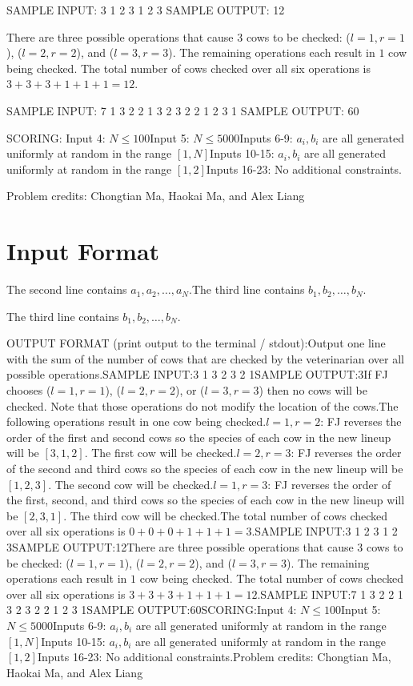 \documentclass[12pt]{article}
\begin{document}
SAMPLE INPUT:
3
1 2 3
1 2 3
SAMPLE OUTPUT: 
12

There are three possible operations that cause $3$ cows to be checked:
($l=1,r=1$), ($l=2,r=2$), and ($l=3,r=3$). The remaining operations each result
in $1$ cow being checked. The total number of cows checked over all six
operations is $3+3+3+1+1+1=12$.

SAMPLE INPUT:
7
1 3 2 2 1 3 2
3 2 2 1 2 3 1
SAMPLE OUTPUT: 
60

SCORING:
Input 4: $N\le 100$Input 5: $N\le 5000$Inputs 6-9: $a_i, b_i$ are all generated uniformly at random in the range
$[1,N]$Inputs 10-15: $a_i, b_i$ are all generated uniformly at random in the range
$[1,2]$Inputs 16-23: No additional constraints.


Problem credits: Chongtian Ma, Haokai Ma, and Alex Liang



\section*{Input Format}
The second line contains $a_1, a_2, \ldots, a_N$.The third line contains $b_1, b_2, \ldots, b_N$.

The third line contains $b_1, b_2, \ldots, b_N$.

OUTPUT FORMAT (print output to the terminal / stdout):Output one line with the sum of the number of cows that are checked by the
veterinarian  over all possible operations.SAMPLE INPUT:3
1 3 2
3 2 1SAMPLE OUTPUT:3If FJ chooses ($l=1,r=1$), ($l=2,r=2$), or ($l=3,r=3$) then no cows will be
checked. Note that those operations do not modify the location of the cows.The following operations result in one cow being checked.$l=1,r=2$: FJ reverses the order of the first and second cows so the species
of each cow in the new lineup will be $[3,1,2]$. The first cow will be checked.$l=2,r=3$: FJ reverses the order of the second and third cows so the species
of each cow in the new lineup will be $[1,2,3]$. The second cow will be checked.$l=1,r=3$: FJ reverses the order of the first, second, and third cows so the
species of each cow in the new lineup will be $[2,3,1]$. The third cow will be
checked.The total number of cows checked over all six operations is $0+0+0+1+1+1=3$.SAMPLE INPUT:3
1 2 3
1 2 3SAMPLE OUTPUT:12There are three possible operations that cause $3$ cows to be checked:
($l=1,r=1$), ($l=2,r=2$), and ($l=3,r=3$). The remaining operations each result
in $1$ cow being checked. The total number of cows checked over all six
operations is $3+3+3+1+1+1=12$.SAMPLE INPUT:7
1 3 2 2 1 3 2
3 2 2 1 2 3 1SAMPLE OUTPUT:60SCORING:Input 4: $N\le 100$Input 5: $N\le 5000$Inputs 6-9: $a_i, b_i$ are all generated uniformly at random in the range
$[1,N]$Inputs 10-15: $a_i, b_i$ are all generated uniformly at random in the range
$[1,2]$Inputs 16-23: No additional constraints.Problem credits: Chongtian Ma, Haokai Ma, and Alex Liang
\end{document}
